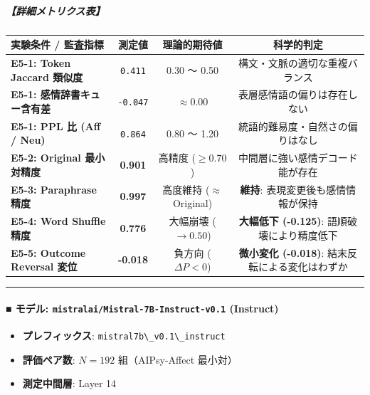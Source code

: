 \subparagraph{【詳細メトリクス表】}
\begin{center}
\small
\begin{tabular}{lccc}
\toprule
\textbf{実験条件 / 監査指標} & \textbf{測定値} & \textbf{理論的期待値} & \textbf{科学的判定} \\
\midrule
\textbf{E5-1: Token Jaccard 類似度} & \texttt{0.411} & 0.30 〜 0.50 & 構文・文脈の適切な重複バランス \\
\textbf{E5-1: 感情辞書キュー含有差} & \texttt{-0.047} & $\approx 0.00$ & 表層感情語の偏りは存在しない \\
\textbf{E5-1: PPL 比 (Aff / Neu)} & \texttt{0.864} & 0.80 〜 1.20 & 統語的難易度・自然さの偏りはなし \\
\textbf{E5-2: Original 最小対精度} & \textbf{0.901} & 高精度 ($\ge 0.70$) & 中間層に強い感情デコード能が存在 \\
\textbf{E5-3: Paraphrase 精度} & \textbf{0.997} & 高度維持 ($\approx$ Original) & \textbf{維持}: 表現変更後も感情情報が保持 \\
\textbf{E5-4: Word Shuffle 精度} & \textbf{0.776} & 大幅崩壊 ($\rightarrow 0.50$) & \textbf{大幅低下 (-0.125)}: 語順破壊により精度低下 \\
\textbf{E5-5: Outcome Reversal 変位} & \textbf{-0.018} & 負方向 ($\Delta P < 0$) & \textbf{微小変化 (-0.018)}: 結末反転による変化はわずか \\
\bottomrule
\end{tabular}
\end{center}


\vspace{0.5em}\hrule\vspace{0.5em}

\paragraph{■ モデル: \texttt{mistralai/Mistral-7B-Instruct-v0.1} (Instruct)}
\begin{itemize}
\item \textbf{プレフィックス}: \texttt{mistral7b\textbackslash{}\_v0.1\textbackslash{}\_instruct}
\item \textbf{評価ペア数}: $N=192$ 組（AIPsy-Affect 最小対）
\item \textbf{測定中間層}: Layer 14
\end{itemize}

